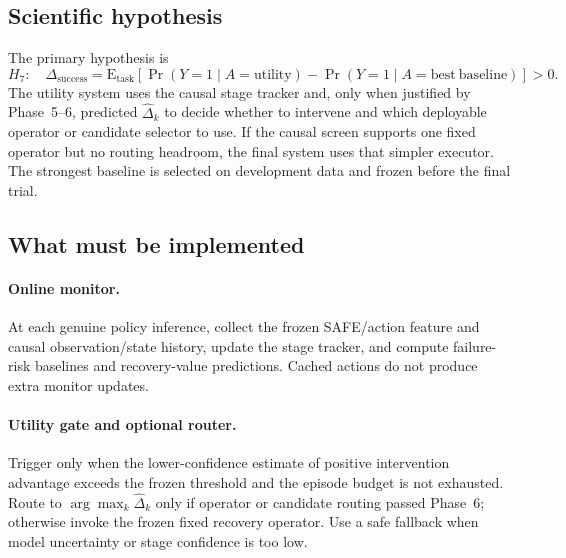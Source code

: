 

\subsection{Scientific hypothesis}

The primary hypothesis is
\begin{equation}
  H_7:\quad
  \Delta_{\mathrm{success}}
  = \mathrm{E}_{\mathrm{task}}
  [\Pr(Y=1\mid A=\mathrm{utility})
  -\Pr(Y=1\mid A=\mathrm{best\ baseline})]>0.
\end{equation}
The utility system uses the causal stage tracker and, only when justified by Phase~5--6, predicted $\hat{\Delta}_k$ to decide whether to intervene and which deployable operator or candidate selector to use. If the causal screen supports one fixed operator but no routing headroom, the final system uses that simpler executor. The strongest baseline is selected on development data and frozen before the final trial.

\subsection{What must be implemented}

\paragraph{Online monitor.}
At each genuine policy inference, collect the frozen SAFE/action feature and causal observation/state history, update the stage tracker, and compute failure-risk baselines and recovery-value predictions. Cached actions do not produce extra monitor updates.

\paragraph{Utility gate and optional router.}
Trigger only when the lower-confidence estimate of positive intervention advantage exceeds the frozen threshold and the episode budget is not exhausted. Route to $\arg\max_k\hat{\Delta}_k$ only if operator or candidate routing passed Phase~6; otherwise invoke the frozen fixed recovery operator. Use a safe fallback when model uncertainty or stage confidence is too low.

